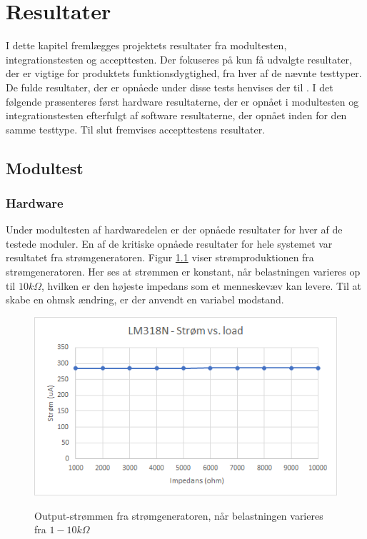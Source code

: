 \chapter{Resultater}

I dette kapitel fremlægges projektets resultater fra modultesten, integrationstesten og  accepttesten. Der fokuseres på kun få udvalgte resultater, der er vigtige for produktets funktionsdygtighed,  fra hver af de nævnte testtyper. De fulde resultater, der er opnåede under disse tests henvises der til . I det følgende præsenteres først hardware resultaterne, der er opnået i modultesten og integrationstesten efterfulgt af software resultaterne, der opnået inden for den samme testtype. Til slut fremvises accepttestens resultater.     

\section{Modultest}
\subsection{Hardware}
Under modultesten af hardwaredelen er der opnåede resultater for hver af de testede moduler. En af de kritiske opnåede resultater for hele systemet var resultatet fra strømgeneratoren. Figur \ref{fig:Stromgeneratorload} viser strømproduktionen fra strømgeneratoren. Her ses at strømmen er konstant, når belastningen varieres op til $10k \Omega$, hvilken er den højeste impedans som et menneskevæv kan levere\cite[s. 49]{Chester2014}. Til at skabe en ohmsk ændring, er der anvendt en variabel modstand.        

\begin{figure}[H] 
\centering
{\includegraphics[width=12cm]
{Figure/Stromgeneratorload}}
\caption{Output-strømmen fra strømgeneratoren, når belastningen varieres fra $1 - 10k\Omega$}
\label{fig:Stromgeneratorload}
\end{figure}


